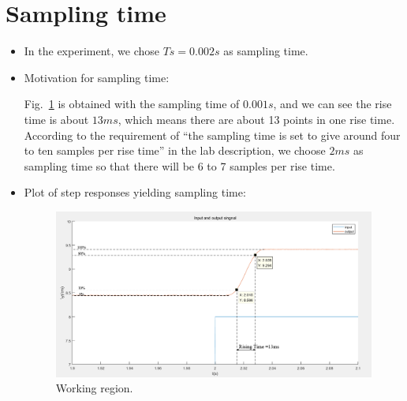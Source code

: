 \documentclass[10pt,a4paper]{article}
\begin{document}
\section{Sampling time}
\begin{itemize}
    \item In the experiment, we chose $Ts = 0.002s$ as sampling time.
    \item Motivation for sampling time:
    \par Fig.~\ref{fig:samplingTime} is obtained with the sampling time of $0.001s$, and we can see the rise time is about $13ms$, which means there are about 13 points in one rise time. According to the requirement of ``the sampling time is set to give around four to ten samples per rise time'' in the lab description, we choose $2ms$ as sampling time so that there will be 6 to 7 samples per rise time.
    \item Plot of step responses yielding sampling time:
    \begin{figure}[h]
		\footnotesize
		\centering 
		\includegraphics[width=\columnwidth]{findSamplingTime.png} 
		\caption{Working region.}
		\label{fig:samplingTime}
	\end{figure}
\end{itemize}

\end{document}
